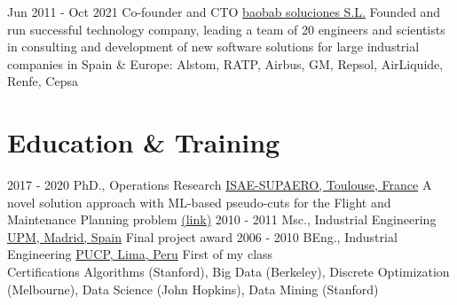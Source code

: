 \documentclass[letterpaper]{twentysecondcv} %
\begin{document}
\begin{twenty}
	\twentyitem
    	{Jun 2011 -}
		{Oct 2021}
        {Co-founder and CTO}
        {\href{https://baobabsoluciones.es/en/}{baobab soluciones S.L.}}
        {}
        {Founded and run successful technology company, leading a team of 20 engineers and scientists in consulting and development of new software solutions for large industrial companies in Spain \& Europe: Alstom, RATP, Airbus, GM, Repsol, AirLiquide, Renfe, Cepsa
        }
\end{twenty}

\section{Education \& Training}

\begin{twenty} %
  \twentyitemshorttest
      {2017 - 2020}
        {}
        {PhD., Operations Research}
        {\href{https://www.isae-supaero.fr/en/}{ISAE-SUPAERO, Toulouse, France}}
        {A novel solution approach with ML-based pseudo-cuts for the Flight and Maintenance Planning problem \href{https://link.springer.com/article/10.1007/s00291-020-00591-z}{(link)}}
  \twentyitemshorttest
      {2010 - 2011}
    {}
        {Msc., Industrial Engineering}
        {\href{https://www.upm.es/internacional}{UPM, Madrid, Spain}}
        {Final project award}
  \twentyitemshorttest
      {2006 - 2010}
    {}
        {BEng., Industrial Engineering}
        {\href{https://www.pucp.edu.pe/}{PUCP, Lima, Peru}}
        {First of my class}
  \\
  \twentyitemshorttest
      {Certifications}
    {}
        {Algorithms (Stanford), Big Data (Berkeley), Discrete Optimization (Melbourne), Data Science (John Hopkins), Data Mining (Stanford)}
        {}
        {}

\end{twenty}
\end{document}
